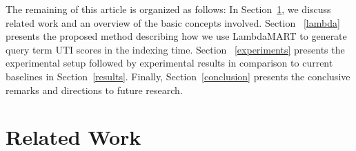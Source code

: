 \documentclass[preprint,review,10pt,3p]{elsarticle}
\begin{document}





The remaining  of this article is organized as follows: In Section~\ref{relatedwork}, we discuss related work and an overview of the basic concepts involved. Section ~\ref{lambda} presents the proposed method describing how we use LambdaMART to generate query term UTI scores in the indexing time. Section ~\ref{experiments} presents the experimental setup followed by experimental results in comparison to current baselines in Section~\ref{results}. Finally, Section~\ref{conclusion} presents the conclusive remarks and directions to future research.

\section{Related Work}
\label{relatedwork}

\end{document}
